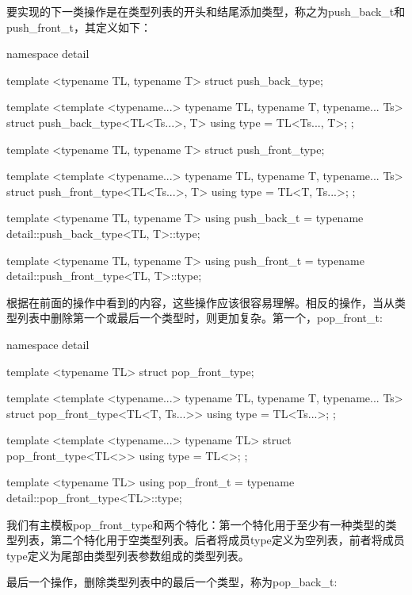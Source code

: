 要实现的下一类操作是在类型列表的开头和结尾添加类型，称之为push\_back\_t和push\_front\_t，其定义如下：

\begin{cpp}
namespace detail
{
	template <typename TL, typename T>
	struct push_back_type;
	
	template <template <typename...> typename TL,
			  typename T, typename... Ts>
	struct push_back_type<TL<Ts...>, T>
	{
		using type = TL<Ts..., T>;
	};

	template <typename TL, typename T>
	struct push_front_type;
	
	template <template <typename...> typename TL,
			  typename T, typename... Ts>
	struct push_front_type<TL<Ts...>, T>
	{
		using type = TL<T, Ts...>;
	};
}

template <typename TL, typename T>
using push_back_t =
	typename detail::push_back_type<TL, T>::type;
	
template <typename TL, typename T>
using push_front_t =
	typename detail::push_front_type<TL, T>::type;
\end{cpp}

根据在前面的操作中看到的内容，这些操作应该很容易理解。相反的操作，当从类型列表中删除第一个或最后一个类型时，则更加复杂。第一个，pop\_front\_t:

\begin{cpp}
namespace detail
{
	template <typename TL>
	struct pop_front_type;
	
	template <template <typename...> typename TL,
	          typename T, typename... Ts>
	struct pop_front_type<TL<T, Ts...>>
	{
		using type = TL<Ts...>;
	};

	template <template <typename...> typename TL>
	struct pop_front_type<TL<>>
	{
		using type = TL<>;
	};
}

template <typename TL>
using pop_front_t =
	typename detail::pop_front_type<TL>::type;
\end{cpp}

我们有主模板pop\_front\_type和两个特化：第一个特化用于至少有一种类型的类型列表，第二个特化用于空类型列表。后者将成员type定义为空列表，前者将成员type定义为尾部由类型列表参数组成的类型列表。

最后一个操作，删除类型列表中的最后一个类型，称为pop\_back\_t:

